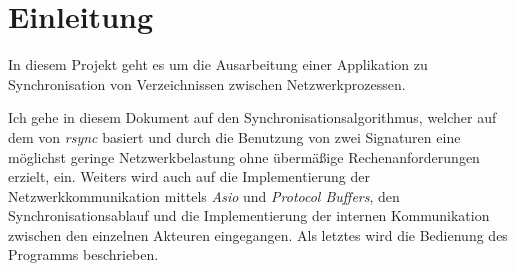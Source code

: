 \section{Einleitung}
\label{cha:Einleitung}

In diesem Projekt geht es um die Ausarbeitung einer Applikation zu Synchronisation von Verzeichnissen zwischen Netzwerkprozessen.

Ich gehe in diesem Dokument auf den Synchronisationsalgorithmus, welcher auf dem von \textit{rsync}\cite{rsync} basiert und durch die Benutzung von 
zwei Signaturen eine möglichst geringe Netzwerkbelastung ohne übermäßige Rechenanforderungen erzielt, ein. Weiters wird auch auf die Implementierung der 
Netzwerkkommunikation mittels \textit{Asio}\cite{asio} und \textit{Protocol Buffers}\cite{proto}, den Synchronisationsablauf und die Implementierung der 
internen Kommunikation zwischen den einzelnen Akteuren eingegangen. Als letztes wird die Bedienung des Programms beschrieben.
